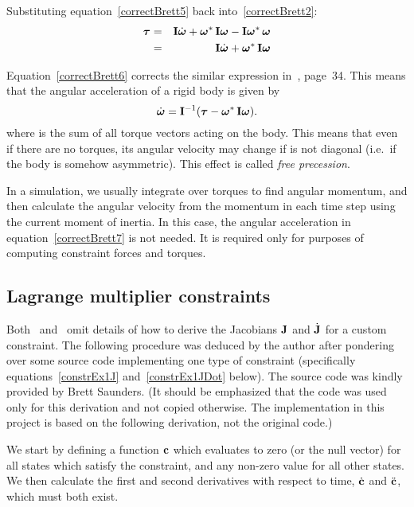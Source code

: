 Substituting equation~\ref{correctBrett5} back into~\ref{correctBrett2}:
\begin{eqnarray}
\ve{\tau} & = & \m{I}\dot{\ve{\omega}} + \dual{\ve{\omega}}\,\m{I}\ve{\omega} -
    \m{I}\dual{\ve{\omega}}\,\ve{\omega} \nonumber \\
& = & \m{I}\dot{\ve{\omega}} + \dual{\ve{\omega}}\,\m{I}\ve{\omega} \label{correctBrett6}
\end{eqnarray}

Equation~\ref{correctBrett6} corrects the similar expression in~\cite{Saunders:PhD},
page~34. This means that the angular acceleration of a rigid body is given by
\begin{equation}
\label{correctBrett7}
\dot{\ve{\omega}} = \m{I}^{-1} (\ve{\tau} - \dual{\ve{\omega}}\,\m{I}\ve{\omega}).
\end{equation}
where \ve{\tau} is the sum of all torque vectors acting on the body. This means that even if
there are no torques, its angular velocity may change if  is not diagonal (i.e.\ if
the body is somehow asymmetric). This effect is called \emph{free precession}.

In a simulation, we usually integrate over torques to find angular momentum, and then calculate
the angular velocity from the momentum in each time step using the current moment of inertia. In
this case, the angular acceleration in equation~\ref{correctBrett7} is not needed. It is required
only for purposes of computing constraint forces and torques.


\subsection{Lagrange multiplier constraints}

Both~\cite{BaraffWitkin:97} and~\cite{Saunders:PhD} omit details of how to derive the Jacobians
$\m{J}$ and $\dot{\m{J}}$ for a custom constraint. The following procedure was deduced
by the author after pondering over some source code implementing one type of constraint
(specifically equations~\ref{constrEx1J} and~\ref{constrEx1JDot} below). The source code
was kindly provided by Brett Saunders. (It should be emphasized that the code was used only
for this derivation and not copied otherwise. The implementation in this project is based
on the following derivation, not the original code.)

We start by defining a function $\ve{c}$ which evaluates to zero (or the null vector) for
all states which satisfy the constraint, and any non-zero value for all other states. 
We then calculate the first and second derivatives with respect to time, $\dot{\ve{c}}$
and $\ddot{\ve{c}}$, which must both exist.

